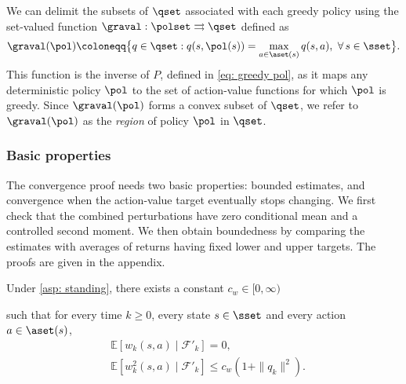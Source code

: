 We can delimit the subsets of $\qset$ associated with each greedy policy using the set-valued function $\graval : \polset \rightrightarrows \qset$ defined as
\begin{align}
\label{eq: greedy action values}
    \graval(\pol) \coloneqq \big\{ q \in \qset : q(s, \pol(s)) = \max_{a \in \aset(s)} q(s,a), \ \forall \, s \in \sset \big\} .
\end{align}
This function is the inverse of $P$, defined in \eqref{eq: greedy pol}, as it maps any deterministic policy $\pol$ to the set of action-value functions for which $\pol$ is greedy.
Since $\graval(\pol)$ forms a convex subset of $\qset$, we refer to $\graval(\pol)$ as the \textit{region} of policy $\pol$ in $\qset$.























\subsubsection{Basic properties}
\label{sec: replacement foundations}
The convergence proof needs two basic properties: bounded estimates, and convergence when the action-value target eventually stops changing.
We first check that the combined perturbations have zero conditional mean and a controlled second moment. We then obtain boundedness by comparing the estimates with averages of returns having fixed lower and upper targets. The proofs are given in the appendix.

\begin{lemma}

\label{thm: properties of noise}

Under \autoref{asp: standing}, there exists a constant $c_w \in [0, \infty)$ 

such that for every time $k \ge 0$, every state $s \in \sset$ and every action $a \in \aset(s)$,
\begin{align}
\label{eq: muw_mds}

&\mathbb E\!\left[w_k(s,a) \mid \mathcal F'_k\right] = 0,
\\
\label{eq: muw_second_moment}

&\mathbb E\!\left[w_k^2(s,a) \mid \mathcal F'_k\right]
\le c_w(1+\|q_k\|^2) .
\end{align}

\end{lemma}


